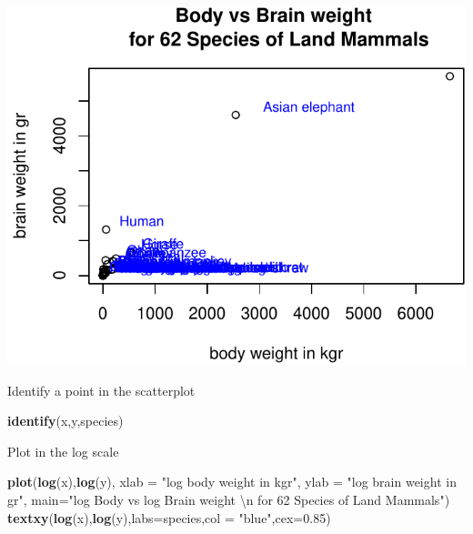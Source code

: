 \documentclass[]{article}
\newenvironment{Shaded}{\begin{snugshade}}{\end{snugshade}}
\newcommand{\KeywordTok}[1]{\textcolor[rgb]{0.13,0.29,0.53}{\textbf{{#1}}}}
\newcommand{\DataTypeTok}[1]{\textcolor[rgb]{0.13,0.29,0.53}{{#1}}}
\newcommand{\FloatTok}[1]{\textcolor[rgb]{0.00,0.00,0.81}{{#1}}}
\newcommand{\CharTok}[1]{\textcolor[rgb]{0.31,0.60,0.02}{{#1}}}
\newcommand{\StringTok}[1]{\textcolor[rgb]{0.31,0.60,0.02}{{#1}}}
\newcommand{\NormalTok}[1]{{#1}}
\numberwithin{equation}{section}
\begin{document}
\begin{center}\includegraphics{index_files/figure-latex/unnamed-chunk-74-1} \end{center}

Identify a point in the scatterplot

\begin{Shaded}
\begin{Highlighting}[]
\KeywordTok{identify}\NormalTok{(x,y,species)}
\end{Highlighting}
\end{Shaded}

Plot in the log scale

\begin{Shaded}
\begin{Highlighting}[]
\KeywordTok{plot}\NormalTok{(}\KeywordTok{log}\NormalTok{(x),}\KeywordTok{log}\NormalTok{(y), }\DataTypeTok{xlab =} \StringTok{"log body weight in kgr"}\NormalTok{, }\DataTypeTok{ylab =} \StringTok{"log brain weight in gr"}\NormalTok{, }
     \DataTypeTok{main=}\StringTok{"log Body vs log Brain weight }\CharTok{\textbackslash{}n}\StringTok{ for 62 Species of Land Mammals"}\NormalTok{)}
\KeywordTok{textxy}\NormalTok{(}\KeywordTok{log}\NormalTok{(x),}\KeywordTok{log}\NormalTok{(y),}\DataTypeTok{labs=}\NormalTok{species,}\DataTypeTok{col =} \StringTok{"blue"}\NormalTok{,}\DataTypeTok{cex=}\FloatTok{0.85}\NormalTok{) }
\end{Highlighting}
\end{Shaded}
\end{document}
